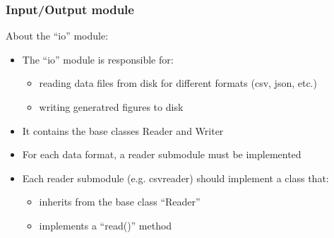 \begin{frame}
  \frametitle{Input/Output module}
  About the ``io'' module:
  \begin{itemize}
    \item The ``io'' module is responsible for:
      \begin{itemize}
        \item reading data files from disk for different 
          formats (csv, json, etc.) %
        \item writing generatred figures to disk
      \end{itemize}
    \item It contains the base classes Reader and Writer
    \item For each data format, a reader submodule must be implemented
    \item Each reader submodule (e.g. csvreader) should implement a class that:
      \begin{itemize}
        \item inherits from the base class ``Reader''
        \item implements a ``read()'' method
      \end{itemize}
  \end{itemize}
\end{frame}
